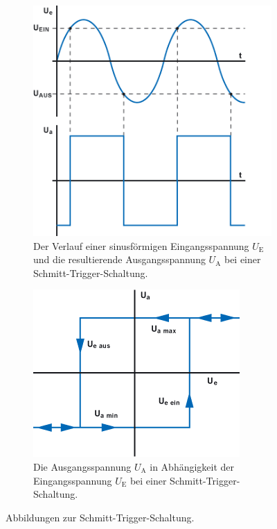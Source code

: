 \begin{figure}
    \centering
    \begin{subfigure}{0.48\textwidth}
        \centering
        \includegraphics[width=0.75\linewidth]{./figures/Kurvenverlauf.png}
        \caption{Der Verlauf einer sinusförmigen Eingangsspannung $U_\text{E}$ und die resultierende Ausgangsspannung $U_\text{A}$ bei einer Schmitt-Trigger-Schaltung. \cite{SchmittTrigger}}
        \label{fig:Kurvenverlauf}
    \end{subfigure}
    \begin{subfigure}{0.48\textwidth}
        \centering
        \includegraphics[width=0.8\linewidth]{./figures/Hysterese.png}
        \caption{Die Ausgangsspannung $U_\text{A}$ in Abhängigkeit der Eingangsspannung $U_\text{E}$ bei einer Schmitt-Trigger-Schaltung. \cite{SchmittTrigger}}
        \label{fig:Hysterese}
    \end{subfigure}
    \caption{Abbildungen zur Schmitt-Trigger-Schaltung.}
    \label{fig:Abbildung}
\end{figure}

